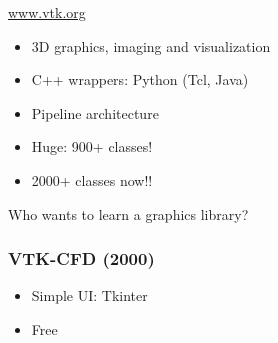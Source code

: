\begin{frame}
\Huge
\begin{center}
    \vspace*{1in}
    \url{www.vtk.org}
\end{center}
\end{frame}

\begin{frame}
    \Large
    \begin{itemize}
    \item 3D graphics, imaging and visualization
    \item C++ wrappers:  Python (Tcl, Java)
    \item Pipeline architecture
    \item Huge: 900+ classes!
    \item 2000+ classes now!!
    \end{itemize}
\end{frame}

\begin{frame}
    \Large
    \begin{center}
        Who wants to learn a graphics
         library?
    \end{center}
\end{frame}

\begin{frame}
    \frametitle{VTK-CFD (2000)}
    \Large
    \begin{itemize}
        \item Simple UI: Tkinter
        \item Free
    \end{itemize}
\end{frame}

\begin{frame}[plain]
\end{frame}

\begin{frame}[plain]
\end{frame}

\begin{frame}[plain]
\end{frame}


\begin{frame}[plain]
\end{frame}

